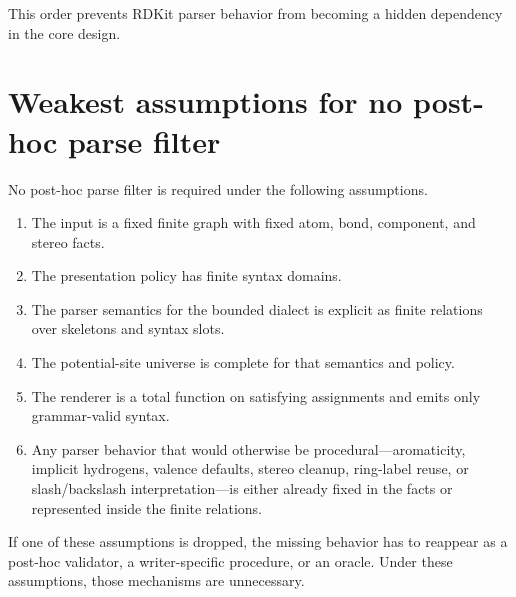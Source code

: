 \documentclass[10pt,a4paper]{article}
\theoremstyle{definition}
\theoremstyle{remark}
\begin{document}
This order prevents RDKit parser behavior from becoming a hidden dependency in
the core design.

\section{Weakest assumptions for no post-hoc parse filter}
\label{s:weakest}

No post-hoc parse filter is required under the following assumptions.
\begin{enumerate}[leftmargin=*]
\item The input is a fixed finite graph with fixed atom, bond, component, and
      stereo facts.
\item The presentation policy has finite syntax domains.
\item The parser semantics for the bounded dialect is explicit as finite
      relations over skeletons and syntax slots.
\item The potential-site universe is complete for that semantics and policy.
\item The renderer is a total function on satisfying assignments and emits only
      grammar-valid syntax.
\item Any parser behavior that would otherwise be procedural---aromaticity,
      implicit hydrogens, valence defaults, stereo cleanup, ring-label reuse,
      or slash/backslash interpretation---is either already fixed in the facts
      or represented inside the finite relations.
\end{enumerate}

If one of these assumptions is dropped, the missing behavior has to reappear as a
post-hoc validator, a writer-specific procedure, or an oracle.  Under these
assumptions, those mechanisms are unnecessary.
\end{document}
